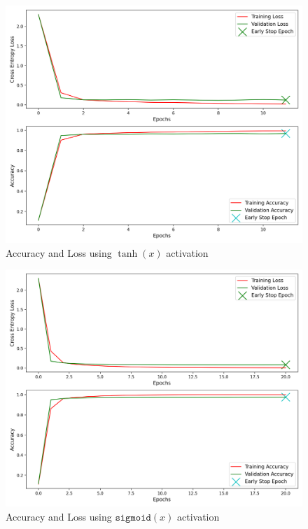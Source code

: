 \begin{figure}[H]
	\centering
	\includegraphics[width=1.0\textwidth]{./images/activation_tanh.png}
	\caption{Accuracy and Loss using $\tanh(x)$ activation}
	\label{fig:tanh}
\end{figure}


\begin{figure}[H]
	\centering
	\includegraphics[width=1.0\textwidth]{./images/activation_sigmoid.png}
	\caption{Accuracy and Loss using $\texttt{sigmoid}(x)$ activation}
	\label{fig:sigmoid}
\end{figure}

